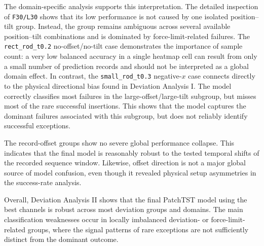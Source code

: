 The domain-specific analysis supports this interpretation. The detailed inspection of \texttt{F30/L30} shows that its low performance is not caused by one isolated position--tilt group. Instead, the group remains ambiguous across several available position--tilt combinations and is dominated by force-limit-related failures. The \texttt{rect\_rod\_t0.2} no-offset/no-tilt case demonstrates the importance of sample count: a very low balanced accuracy in a single heatmap cell can result from only a small number of prediction records and should not be interpreted as a global domain effect. In contrast, the \texttt{small\_rod\_t0.3} negative-$x$ case connects directly to the physical directional bias found in Deviation Analysis I. The model correctly classifies most failures in the large-offset/large-tilt subgroup, but misses most of the rare successful insertions. This shows that the model captures the dominant failures associated with this subgroup, but does not reliably identify successful exceptions.

The record-offset groups show no severe global performance collapse. This indicates that the final model is reasonably robust to the tested temporal shifts of the recorded sequence window. Likewise, offset direction is not a major global source of model confusion, even though it revealed physical setup asymmetries in the success-rate analysis.

Overall, Deviation Analysis II shows that the final PatchTST model using the best channels is robust across most deviation groups and domains. The main classification weaknesses occur in locally imbalanced deviation- or force-limit-related groups, where the signal patterns of rare exceptions are not sufficiently distinct from the dominant outcome.

